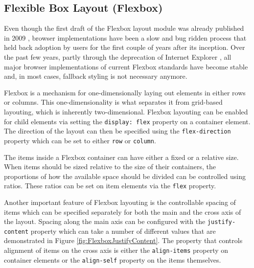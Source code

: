 \subsection{Flexible Box Layout (Flexbox)}
\label{sec:Flexbox}

Even though the first draft of the Flexbox layout module was already published in 2009 \parencite{CSSFlexboxFirstDraft}, browser implementations have been a slow and bug ridden process \parencite{CanIUseCSSFlexbox} that held back adoption by users for the first couple of years after its inception. Over the past few years, partly through the deprecation of Internet Explorer \parencite{IEDeprecation}, all major browser implementations of current Flexbox standards \parencite{CSSFlexbox} have become stable and, in most cases, fallback styling is not necessary anymore.

Flexbox is a mechanism for one-dimensionally laying out elements in either rows or columns. This one-dimensionality is what separates it from grid-based layouting, which is inherently two-dimensional. Flexbox layouting can be enabled for child elements via setting the \lstinline{display: flex} property on a container element. The direction of the layout can then be specified using the \lstinline{flex-direction} property which can be set to either \lstinline{row} or \lstinline{column}.

The items inside a Flexbox container can have either a fixed or a relative size. When items should be sized relative to the size of their containers, the proportions of how the available space should be divided can be controlled using ratios. These ratios can be set on item elements via the \lstinline{flex} property.

Another important feature of Flexbox layouting is the controllable spacing of items which can be specified separately for both the main and the cross axis of the layout. Spacing along the main axis can be configured with the \lstinline{justify-content} property which can take a number of different values that are demonstrated in Figure \ref{fig:FlexboxJustifyContent}. The property that controls alignment of items on the cross axis is either the \lstinline{align-items} property on container elements or the \lstinline{align-self} property on the items themselves.

